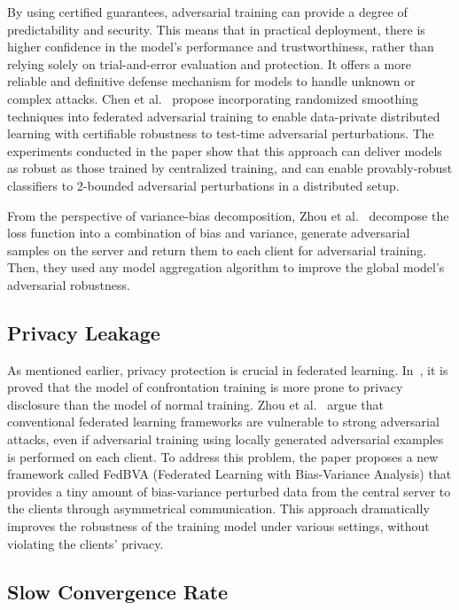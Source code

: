 \documentclass[a4paper,fleqn]{cas-dc}
\begin{document}
By using certified guarantees, adversarial training can
provide a degree of predictability and security. This means
that in practical deployment, there is higher confidence in
the model's performance and trustworthiness, rather than
relying solely on trial-and-error evaluation and protection.
It offers a more reliable and definitive defense mechanism
for models to handle unknown or complex attacks.
Chen et al.~\cite{chen2021certifiably} propose incorporating randomized
smoothing techniques into federated adversarial training
to enable data-private distributed learning with
certifiable robustness to test-time adversarial perturbations.
The experiments conducted in the paper show that this
approach can deliver models as robust as those trained
by centralized training, and can enable provably-robust
classifiers to 2-bounded adversarial perturbations in a
distributed setup.

From the perspective of variance-bias decomposition,
Zhou et al.~\cite{zhou2022adversarial} decompose the loss function into a
combination of bias and variance, generate adversarial
samples on the server and return them to each client for
adversarial training. Then, they used any model
aggregation algorithm to improve the global model's adversarial robustness.

\subsection{Privacy Leakage}
As mentioned earlier, privacy protection is crucial in
federated learning. In~\cite{zhang2022privacy}, it is proved that the model of
confrontation training is more prone to privacy disclosure
than the model of normal training. Zhou et al.~\cite{zhou2020adversarially}
argue that conventional federated learning frameworks are
vulnerable to strong adversarial attacks, even if adversarial
training using locally generated adversarial examples is
performed on each client. To address this problem, the
paper proposes a new framework called FedBVA (Federated
Learning with Bias-Variance Analysis) that provides a tiny
amount of bias-variance perturbed data from the central
server to the clients through asymmetrical communication.
This approach dramatically improves the robustness of the
training model under various settings, without violating
the clients' privacy.

\subsection{Slow Convergence Rate}
\end{document}
